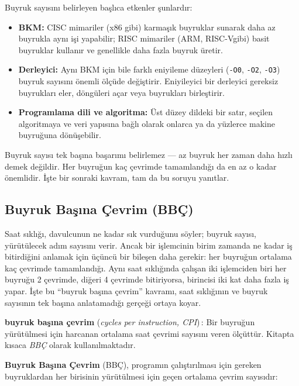Buyruk sayısını belirleyen başlıca etkenler şunlardır:
\begin{itemize}
    \item \textbf{BKM:} CISC mimariler (x86 gibi) karmaşık buyruklar sunarak daha az buyrukla aynı işi yapabilir; RISC mimariler (ARM, RISC-V\@ gibi) basit buyruklar kullanır ve genellikle daha fazla buyruk üretir.
    \item \textbf{Derleyici:} Aynı BKM için bile farklı eniyileme düzeyleri (\texttt{-O0}, \texttt{-O2}, \texttt{-O3}) buyruk sayısını önemli ölçüde değiştirir. Eniyileyici bir derleyici gereksiz buyrukları eler, döngüleri açar veya buyrukları birleştirir.
    \item \textbf{Programlama dili ve algoritma:} Üst düzey dildeki bir satır, seçilen algoritmaya ve veri yapısına bağlı olarak onlarca ya da yüzlerce makine buyruğuna dönüşebilir.
\end{itemize}

Buyruk sayısı tek başına başarımı belirlemez --- az buyruk her zaman daha hızlı demek değildir. Her buyruğun kaç çevrimde tamamlandığı da en az o kadar önemlidir. İşte bir sonraki kavram, tam da bu soruyu yanıtlar.


\subsection{Buyruk Başına Çevrim (BBÇ)}
\label{subsec:bbc}

Saat sıklığı, davulcunun ne kadar sık vurduğunu söyler; buyruk sayısı, yürütülecek adım sayısını verir. Ancak bir işlemcinin birim zamanda ne kadar iş bitirdiğini anlamak için üçüncü bir bileşen daha gerekir: her buyruğun ortalama kaç çevrimde tamamlandığı. Aynı saat sıklığında çalışan iki işlemciden biri her buyruğu 2 çevrimde, diğeri 4 çevrimde bitiriyorsa, birincisi iki kat daha fazla iş yapar. İşte bu ``buyruk başına çevrim'' kavramı, saat sıklığının ve buyruk sayısının tek başına anlatamadığı gerçeği ortaya koyar.

\begin{terimnotu}
\textbf{buyruk başına çevrim} (\emph{cycles per instruction, CPI})\,: Bir buyruğun yürütülmesi için harcanan ortalama saat çevrimi sayısını veren ölçüttür. Kitapta kısaca \emph{BBÇ} olarak kullanılmaktadır.
\end{terimnotu}

\textbf{Buyruk Başına Çevrim} (BBÇ), programın çalıştırılması için gereken buyruklardan her birisinin yürütülmesi için geçen ortalama çevrim sayısıdır:

